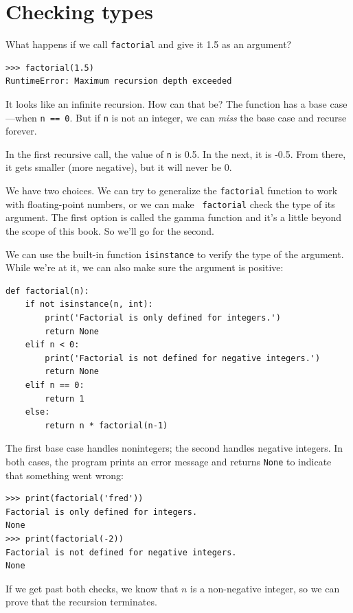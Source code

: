 \documentclass[10pt]{book}
\begin{document}
\section{Checking types}
\label{guardian}

What happens if we call {\tt factorial} and give it 1.5 as an argument?

\begin{verbatim}
>>> factorial(1.5)
RuntimeError: Maximum recursion depth exceeded
\end{verbatim}
%
It looks like an infinite recursion.  How can that be?  The function
has a base case---when {\tt n == 0}.  But if {\tt n} is not an integer,
we can {\em miss} the base case and recurse forever.

In the first recursive call, the value of {\tt n} is 0.5.
In the next, it is -0.5.  From there, it gets smaller
(more negative), but it will never be 0.

We have two choices.  We can try to generalize the {\tt factorial}
function to work with floating-point numbers, or we can make {\tt
  factorial} check the type of its argument.  The first option is
called the gamma function and it's a
little beyond the scope of this book.  So we'll go for the second.

We can use the built-in function {\tt isinstance} to verify the type
of the argument.  While we're at it, we can also make sure the
argument is positive:

\begin{verbatim}
def factorial(n):
    if not isinstance(n, int):
        print('Factorial is only defined for integers.')
        return None
    elif n < 0:
        print('Factorial is not defined for negative integers.')
        return None
    elif n == 0:
        return 1
    else:
        return n * factorial(n-1)
\end{verbatim}
%
The first base case handles nonintegers; the
second handles negative integers.  In both cases, the program prints
an error message and returns {\tt None} to indicate that something
went wrong:

\begin{verbatim}
>>> print(factorial('fred'))
Factorial is only defined for integers.
None
>>> print(factorial(-2))
Factorial is not defined for negative integers.
None
\end{verbatim}
%
If we get past both checks, we know that $n$ is a non-negative integer, so we can prove that the recursion terminates.
\end{document}
